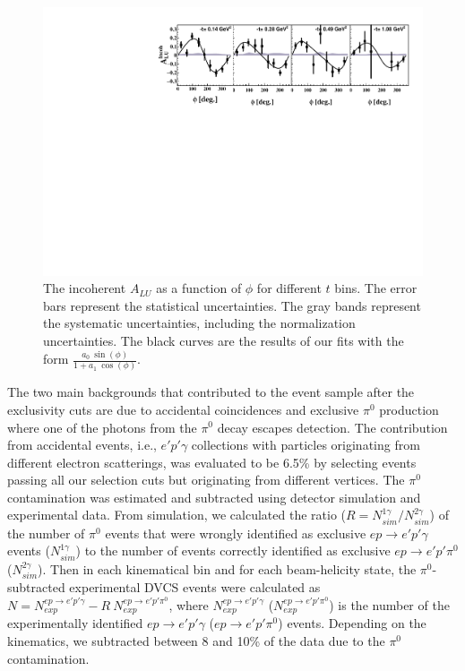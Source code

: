 \documentclass[twocolumn,nofootinbib,prl,superscriptaddress,secnumarabic,amssymb,nobibnotes,aps,floatfix]{revtex4}
\begin{document}
\begin{figure}[t!]
\includegraphics[width=13.9cm]{incoherent_ALU_phi_t.pdf}
\caption{The incoherent $A_{LU}$ as a function of $\phi$ for different $t$ 
   bins. The error bars represent the statistical uncertainties. The gray 
   bands represent the systematic uncertainties, including the normalization 
   uncertainties. The black curves are the results of our fits with the form 
   $\frac{a_{0}~\sin(\phi)}{1+ a_{1}~\cos(\phi)}$.}
\label{fig:alu}
\end{figure}


The two main backgrounds that contributed to the event sample after the 
exclusivity cuts are due to accidental coincidences and exclusive $\pi^0$ 
production where one of the photons from the $\pi^0$ decay escapes detection.  
The contribution from accidental events, i.e., $e'p'\gamma$ collections with 
particles originating from different electron scatterings, was evaluated to be 
6.5\% by selecting events passing all our selection cuts but originating from 
different vertices. The $\pi^0$ contamination was estimated and subtracted using detector 
simulation and experimental data. From simulation, we calculated the ratio ($R 
= N^{1\gamma}_{sim}/N^{2\gamma}_{sim}$) of the number of $\pi^0$ events that 
were wrongly identified as exclusive $ep\rightarrow e'p'\gamma$ events 
($N^{1\gamma}_{sim}$) to the number of events correctly identified as exclusive 
$ep\rightarrow e'p'\pi^0$ ($N^{2\gamma}_{sim}$).  Then in each kinematical bin 
and for each beam-helicity state, the $\pi^0$-subtracted experimental DVCS 
events were calculated as $N = N^{ep\rightarrow e'p'\gamma}_{exp}- 
R~N^{ep\rightarrow e'p'\pi^0}_{exp}$, where $N^{ep\rightarrow 
e'p'\gamma}_{exp}$ ($N^{ep\rightarrow e'p'\pi^0}_{exp}$) is the number of the 
experimentally identified $ep\rightarrow e'p'\gamma$ ($ep\rightarrow 
e'p'\pi^0$) events. Depending on the kinematics, we subtracted
between 8 and 10\% of the data due to the $\pi^0$ contamination. 
\end{document}
